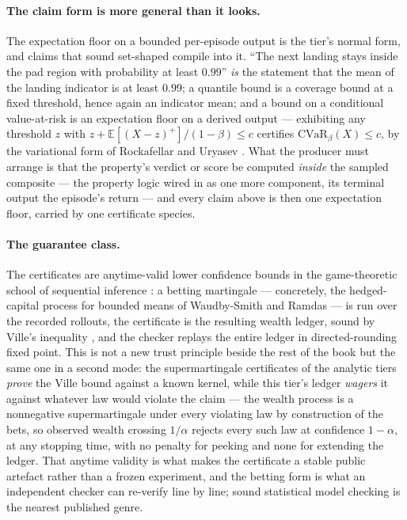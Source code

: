 \paragraph{The claim form is more general than it looks.} The
expectation floor on a bounded per-episode output is the tier's
normal form, and claims that sound set-shaped compile into it. ``The
next landing stays inside the pad region with probability at least
$0.99$'' \emph{is} the statement that the mean of the landing
indicator is at least $0.99$; a quantile bound is a coverage bound
at a fixed threshold, hence again an indicator mean; and a bound on
a conditional value-at-risk is an expectation floor on a derived
output --- exhibiting any threshold $z$ with
$z + \mathbb{E}[(X-z)^{+}]/(1-\beta) \le c$ certifies
$\mathrm{CVaR}_{\beta}(X) \le c$, by the variational form of
Rockafellar and Uryasev \cite{rockafellar00}. What the producer must
arrange is that the property's verdict or score be computed
\emph{inside} the sampled composite --- the property logic wired in
as one more component, its terminal output the episode's return ---
and every claim above is then one expectation floor, carried by one
certificate species.

\paragraph{The guarantee class.} The certificates are anytime-valid
lower confidence bounds in the game-theoretic school of sequential
inference \cite{ramdas22}: a betting martingale --- concretely, the
hedged-capital process for bounded means of Waudby-Smith and Ramdas
\cite{waudbysmith20} --- is run over the recorded rollouts, the
certificate is the resulting wealth ledger, sound by Ville's
inequality \cite{ville1939}, and the checker replays the entire
ledger in directed-rounding fixed point. This is not a new trust
principle beside the rest of the book but the same one in a second
mode: the supermartingale certificates of the analytic tiers
\emph{prove} the Ville bound against a known kernel, while this
tier's ledger \emph{wagers} it against whatever law would violate
the claim --- the wealth process is a nonnegative supermartingale
under every violating law by construction of the bets, so observed
wealth crossing $1/\alpha$ rejects every such law at confidence
$1-\alpha$, at any stopping time, with no penalty for peeking and
none for extending the ledger. That anytime validity is what makes
the certificate a stable public artefact rather than a frozen
experiment, and the betting form is what an independent checker can
re-verify line by line; sound statistical model checking
\cite{budde24} is the nearest published genre.

